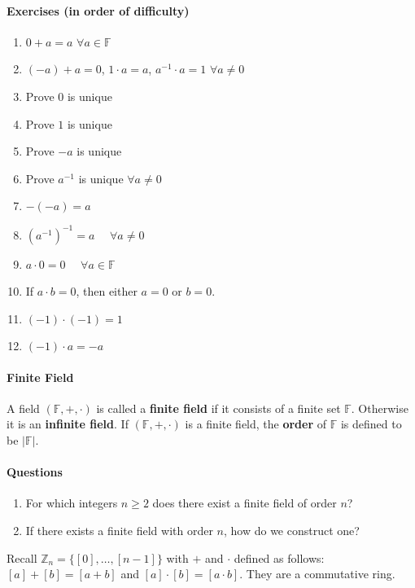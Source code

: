 \documentclass[10pt,letter]{article}
\theoremstyle{plain}
\theoremstyle{definition}
\begin{document}
\paragraph{Exercises (in order of difficulty)}
\begin{enumerate}
    \item $0+a=a$ $\forall a\in\mathbb{F}$ 
    \item $(-a)+a=0$, $1\cdot a=a$, $a^{-1}\cdot a=1$ $\forall a\neq0$
    \item Prove $0$ is unique 
    \item Prove $1$ is unique 
    \item Prove $-a$ is unique 
    \item Prove $a^{-1}$ is unique $\forall a\neq 0$
    \item $-(-a)=a$ 
    \item $(a^{-1})^{-1}=a$ $\quad\forall a\neq0$
    \item $a\cdot0=0$ $\quad\forall a\in\mathbb{F}$ 
    \item If $a\cdot b=0$, then either $a=0$ or $b=0$. 
    \item $(-1)\cdot (-1)=1$ 
    \item $(-1)\cdot a=-a$
\end{enumerate}

\paragraph{Finite Field}
A field $(\mathbb{F},+,\cdot)$ is called a \textbf{finite field} if it consists of a finite set $\mathbb{F}$. Otherwise it is an \textbf{infinite field}. If $(\mathbb{F},+,\cdot)$ is a finite field, the \textbf{order} of $\mathbb{F}$ is defined to be $|\mathbb{F}|$.

\paragraph{Questions}
\begin{enumerate}
    \item For which integers $n\geq2$ does there exist a finite field of order $n$? 
    \item If there exists a finite field with order $n$, how do we construct one?
\end{enumerate}


Recall $\mathbb{Z}_n=\{[0],\ldots,[n-1]\}$ with $+$ and $\cdot$ defined as follows: $[a]+[b]=[a+b]$ and $[a]\cdot[b]=[a\cdot b]$. They are a commutative ring. 
\end{document}
